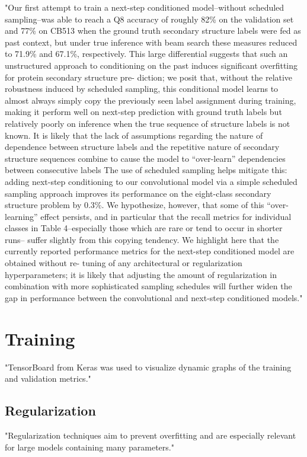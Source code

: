 \documentclass[]{scrartcl}
\begin{document}
"Our first attempt to train a next-step conditioned model–without scheduled sampling–was able to reach a Q8 accuracy of roughly 82\% on the validation set and 77\% on CB513 when the ground truth secondary structure labels were fed as past context, but under true inference with beam search these measures reduced to 71.9\% and 67.1\%, respectively. This large differential suggests that such an unstructured approach to conditioning on the past induces significant overfitting for protein secondary structure pre- diction; we posit that, without the relative robustness induced by scheduled sampling, this conditional model learns to almost always simply copy the previously seen label assignment during training, making it perform well on next-step prediction with ground truth labels but relatively poorly on inference when the true sequence of structure labels is not known. It is likely that the lack of assumptions regarding the nature of dependence between structure labels and the repetitive nature of secondary structure sequences combine to cause the model to “over-learn” dependencies between consecutive labels The use of scheduled sampling helps mitigate this: adding next-step conditioning to our convolutional model via a simple scheduled sampling approach improves its performance on the eight-class secondary structure problem by 0.3\%. We hypothesize, however, that some of this “over-learning” effect persists, and in particular that the recall metrics for individual classes in Table 4–especially those which are rare or tend to occur in shorter runs– suffer slightly from this copying tendency. We highlight here that the currently reported performance metrics for the next-step conditioned model are obtained without re- tuning of any architectural or regularization hyperparameters; it is likely that adjusting the amount of regularization in combination with more sophisticated sampling schedules will further widen the gap in performance between the convolutional and next-step conditioned models." \cite{Busia2017}

\section{Training}
"TensorBoard from Keras was used to visualize dynamic graphs of the training and validation metrics." \cite{Fang2017}

\subsection{Regularization}
"Regularization techniques aim to prevent overfitting and are especially relevant for large models containing many parameters." \cite{Jurtz2017}
\end{document}
